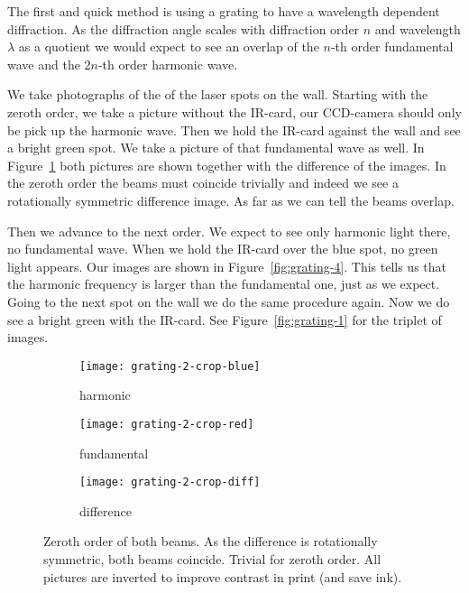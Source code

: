 \documentclass[11pt, english, fleqn, DIV=15, headinclude, BCOR=2cm]{scrreprt}
\begin{document}
The first and quick method is using a grating to have a wavelength dependent
diffraction. As the diffraction angle scales with diffraction order $n$ and
wavelength $\lambda$ as a quotient we would expect to see an overlap of the
$n$-th order fundamental wave and the $2n$-th order harmonic wave.

We take photographs of the of the laser spots on the wall. Starting with the
zeroth order, we take a picture without the IR-card, our CCD-camera should only
be pick up the harmonic wave. Then we hold the IR-card against the wall and see
a bright green spot. We take a picture of that fundamental wave as well. In
Figure~\ref{fig:grating-2} both pictures are shown together with the difference
of the images. In the zeroth order the beams must coincide trivially and indeed
we see a rotationally symmetric difference image. As far as we can tell the
beams overlap.

Then we advance to the next order. We expect to see only harmonic light there,
no fundamental wave. When we hold the IR-card over the blue spot, no green
light appears. Our images are shown in Figure~\ref{fig:grating-4}. This tells
us that the harmonic frequency is larger than the fundamental one, just as we
expect. Going to the next spot on the wall we do the same procedure again. Now
we do see a bright green with the IR-card. See Figure~\ref{fig:grating-1} for
the triplet of images.

\begin{figure}[p]
    \centering
    \begin{subfigure}[c]{0.3\linewidth}
        \centering
        \texttt{[image: grating-2-crop-blue]}
        \caption{%
            harmonic
            }
    \end{subfigure}
    \hfill
    \begin{subfigure}[c]{0.3\linewidth}
        \centering
        \texttt{[image: grating-2-crop-red]}
        \caption{%
            fundamental
            }
    \end{subfigure}
    \hfill
    \begin{subfigure}[c]{0.3\linewidth}
        \centering
        \texttt{[image: grating-2-crop-diff]}
        \caption{%
            difference
            }
    \end{subfigure}
    \caption{%
        Zeroth order of both beams. As the difference is rotationally
        symmetric, both beams coincide. Trivial for zeroth order. All pictures
        are inverted to improve contrast in print (and save ink).
        }
    \label{fig:grating-2}
\end{figure}
\end{document}
